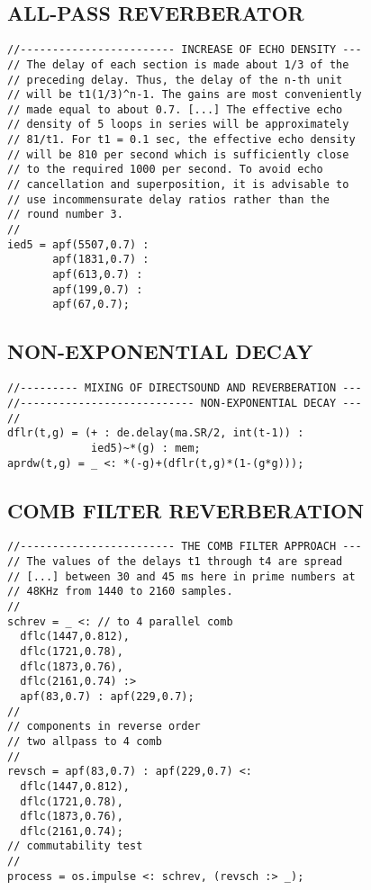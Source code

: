 \subsection*{ALL-PASS REVERBERATOR}
\begin{lstlisting}
//------------------------ INCREASE OF ECHO DENSITY ---
// The delay of each section is made about 1/3 of the
// preceding delay. Thus, the delay of the n-th unit
// will be t1(1/3)^n-1. The gains are most conveniently
// made equal to about 0.7. [...] The effective echo
// density of 5 loops in series will be approximately
// 81/t1. For t1 = 0.1 sec, the effective echo density
// will be 810 per second which is sufficiently close
// to the required 1000 per second. To avoid echo
// cancellation and superposition, it is advisable to
// use incommensurate delay ratios rather than the
// round number 3.
//
ied5 = apf(5507,0.7) :
       apf(1831,0.7) :
       apf(613,0.7) :
       apf(199,0.7) :
       apf(67,0.7);
\end{lstlisting}

\subsection*{NON-EXPONENTIAL DECAY}
\begin{lstlisting}
//--------- MIXING OF DIRECTSOUND AND REVERBERATION ---
//--------------------------- NON-EXPONENTIAL DECAY ---
//
dflr(t,g) = (+ : de.delay(ma.SR/2, int(t-1)) :
             ied5)~*(g) : mem;
aprdw(t,g) = _ <: *(-g)+(dflr(t,g)*(1-(g*g)));
\end{lstlisting}

\subsection*{COMB FILTER REVERBERATION}
\begin{lstlisting}
//------------------------ THE COMB FILTER APPROACH ---
// The values of the delays t1 through t4 are spread
// [...] between 30 and 45 ms here in prime numbers at
// 48KHz from 1440 to 2160 samples.
//
schrev = _ <: // to 4 parallel comb
  dflc(1447,0.812),
  dflc(1721,0.78),
  dflc(1873,0.76),
  dflc(2161,0.74) :>
  apf(83,0.7) : apf(229,0.7);
//
// components in reverse order
// two allpass to 4 comb
//
revsch = apf(83,0.7) : apf(229,0.7) <:
  dflc(1447,0.812),
  dflc(1721,0.78),
  dflc(1873,0.76),
  dflc(2161,0.74);
// commutability test
//
process = os.impulse <: schrev, (revsch :> _);
\end{lstlisting}

